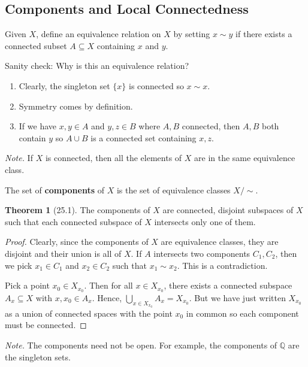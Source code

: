 \documentclass{article}
\newcommand{\nline}{\vspace*{0.5\baselineskip}}
\theoremstyle{definition}
\newtheorem{theorem}{Theorem}[subsection]
\begin{document}
\begin{flushleft}
\subsection{Components and Local Connectedness}

Given $X$, define an equivalence relation on $X$ by setting $x \sim y$ if there exists a connected subset $A \subseteq X$ containing $x$ and $y$.

\nline

Sanity check: Why is this an equivalence relation?

\begin{enumerate}
    \item Clearly, the singleton set $\{x\}$ is connected so $x \sim x$.
    \item Symmetry comes by definition.
    \item If we have $x,y \in A$ and $y,z \in B$ where $A, B$ connected, then $A,B$ both contain $y$ so $A \cup B$ is a connected set containing $x,z$.
\end{enumerate}

\textit{Note.} If $X$ is connected, then all the elements of $X$ are in the same equivalence class.

\nline

The set of \textbf{components} of $X$ is the set of equivalence classes $X / \sim$.

\begin{theorem}[25.1]
The components of $X$ are connected, disjoint subspaces of $X$ such that each connected subspace of $X$ intersects only one of them.
\end{theorem}

\begin{proof}
Clearly, since the components of $X$ are equivalence classes, they are disjoint and their union is all of $X$. If $A$ intersects two components $C_1, C_2$, then we pick $x_1 \in C_1$ and $x_2 \in C_2$ such that $x_1 \sim x_2$. This is a contradiction.

\nline

Pick a point $x_0 \in X_{x_0}$. Then for all $x \in X_{x_0}$, there exists a connected subspace $A_x \subseteq X$ with $x, x_0 \in A_x$. Hence, $\bigcup_{x \in X_{x_0}} A_x = X_{x_0}$. But we have just written $X_{x_0}$ as a union of connected spaces with the point $x_0$ in common so each component must be connected.
\end{proof}

\textit{Note.} The components need not be open. For example, the components of $\mathbb{Q}$ are the singleton sets.


\end{flushleft}
\end{document}
